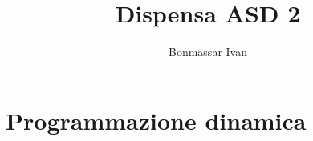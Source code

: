 \documentclass[oneside]{book}
\title {Dispensa ASD 2}
\author{Bonmassar Ivan}
\begin{document}
\maketitle
\tableofcontents


\chapter{Programmazione dinamica}
\end{document}
